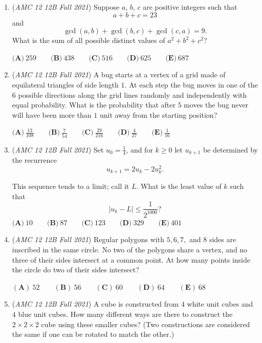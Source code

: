 \begin{enumerate}
$(\textbf{A})\: 75\qquad(\textbf{B}) \: 93\qquad(\textbf{C}) \: 96\qquad(\textbf{D}) \: 129\qquad(\textbf{E}) \: 147$


	\item (\textit{AMC 12 12B Fall 2021}) Suppose $a$, $b$, $c$ are positive integers such that 
 \[a+b+c=23\] and 
 \[\gcd(a,b)+\gcd(b,c)+\gcd(c,a)=9.\] What is the sum of all possible distinct values of $a^2+b^2+c^2$? 


 $\textbf{(A)}\: 259\qquad\textbf{(B)} \: 438\qquad\textbf{(C)} \: 516\qquad\textbf{(D)} \: 625\qquad\textbf{(E)} \: 687$


	\item (\textit{AMC 12 12B Fall 2021}) A bug starts at a vertex of a grid made of equilateral triangles of side length $1$. At each step the bug moves in one of the $6$ possible directions along the grid lines randomly and independently with equal probability. What is the probability that after $5$ moves the bug never will have been more than $1$ unit away from the starting position?


 $\textbf{(A)}\ \frac{13}{108} \qquad\textbf{(B)}\  \frac{7}{54} \qquad\textbf{(C)}\  \frac{29}{216} \qquad\textbf{(D)}\ \frac{4}{27} \qquad\textbf{(E)}\ \frac{1}{16}$


	\item (\textit{AMC 12 12B Fall 2021}) Set $u_0 = \frac{1}{4}$, and for $k \ge 0$ let $u_{k+1}$ be determined by the recurrence 
 \[u_{k+1} = 2u_k - 2u_k^2.\]


 This sequence tends to a limit; call it $L$. What is the least value of $k$ such that 
 \[|u_k-L| \le \frac{1}{2^{1000}}?\]
$\textbf{(A)}\: 10\qquad\textbf{(B)}\: 87\qquad\textbf{(C)}\: 123\qquad\textbf{(D)}\: 329\qquad\textbf{(E)}\: 401$


	\item (\textit{AMC 12 12B Fall 2021}) Regular polygons with $5,6,7,$ and $8$ sides are inscribed in the same circle. No two of the polygons share a vertex, and no three of their sides intersect at a common point. At how many points inside the circle do two of their sides intersect?


 $(\textbf{A})\: 52\qquad(\textbf{B}) \: 56\qquad(\textbf{C}) \: 60\qquad(\textbf{D}) \: 64\qquad(\textbf{E}) \: 68$


	\item (\textit{AMC 12 12B Fall 2021}) A cube is constructed from $4$ white unit cubes and $4$ blue unit cubes. How many different ways are there to construct the $2 \times 2 \times 2$ cube using these smaller cubes? (Two constructions are considered the same if one can be rotated to match the other.)



\end{enumerate}
